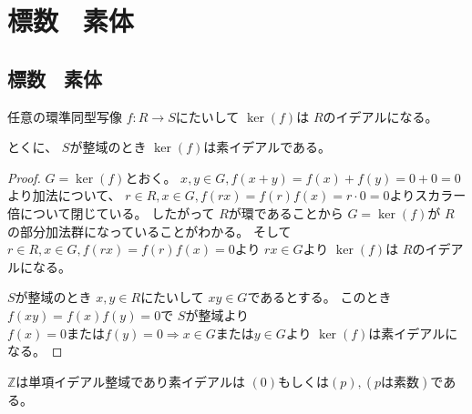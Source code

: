 \documentclass[../master_galois_theory]{subfiles}
\begin{document}
\setcounter{section}{3}

\section{標数 \  素体}

\subsection{標数 \  素体}


\begin{lemm} \label{lemm:kerideal}
  任意の環準同型写像 $f : R \longrightarrow S$にたいして $\ker(f)$は $R$のイデアルになる。

  とくに、 $S$が整域のとき $\ker(f)$は素イデアルである。
\end{lemm}

\begin{proof}
  $G = \ker(f)$とおく。
  $x , y \in G , f(x + y) = f(x) + f(y) = 0 + 0 = 0$より加法について、
  $r \in R , x \in G , f(rx) = f(r)f(x) = r \cdot 0 = 0$よりスカラー倍について閉じている。
  したがって $R$が環であることから $G = \ker(f)$が $R$の部分加法群になっていることがわかる。
  そして $r \in R , x \in G , f(rx) = f(r)f(x) = 0$より $rx \in G$より $\ker(f)$は $R$のイデアルになる。

  $S$が整域のとき $x , y \in R$にたいして $xy \in G$であるとする。
  このとき $f(xy) = f(x)f(y) = 0$で $S$が整域より $f(x) = 0 または f(y) = 0 \Rightarrow x \in G または y \in G$より $\ker(f)$は素イデアルになる。
\end{proof}

\begin{lemm} \label{lemm:Z}
  $\mathbb{Z}$は単項イデアル整域であり素イデアルは $(0) もしくは (p) , (pは素数)$である。
\end{lemm}
\end{document}
